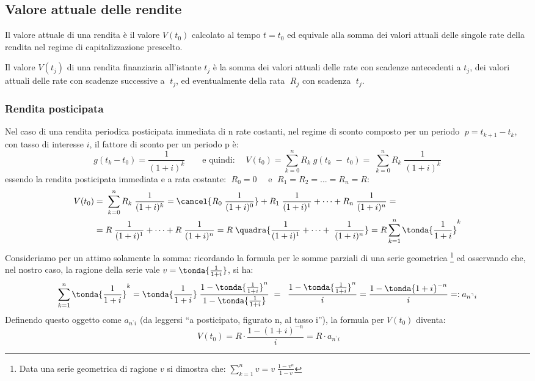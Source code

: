\subsection{Valore attuale delle rendite}
Il valore attuale di una rendita è il valore $V(t_0)$  calcolato al tempo $t = 
t_0$  ed equivale alla somma dei valori attuali delle singole rate della 
rendita nel regime di capitalizzazione prescelto.

Il valore $V(t_j)$ di una rendita finanziaria all'istante $t_j$ è la somma dei valori
attuali delle rate con scadenze antecedenti a $t_j$, dei valori attuali delle rate con 
scadenze successive a $\;t_j$, ed eventualmente della rata $\;R_j$ con scadenza 
$\;t_j$.

\subsubsection{Rendita posticipata}

Nel caso di una rendita periodica posticipata immediata di n rate costanti, nel 
regime di sconto composto per un periodo \(\; p= 
t_{k+1}-t_k\), con tasso di interesse $i$, il fattore di sconto per un periodo p è:
\[g(t_k-t_0)=\frac{1}{(1+i)^k} \qquad \text{e quindi:} \quad \; V(t_0)=\sum^{n}_{k=0}R_k \; g(t_k\;-\;t_0)= \; \sum^{n}_{k=0}R_k \; 
\frac{1}{(1+i)^k}\]
essendo la rendita posticipata immediata e a rata costante: $\;R_{0}=0 \quad$ e 
$\;R_{1}=R_{2}=...=R_{n}=R$:
\[\begin{aligned}
   V(t_0)&=\; \sum^{n}_{k=0}R_k \; \frac{1}{(1+i)^k} =\cancel{R_0 \; 
\frac{1}{(1+i)^0}}+R_1 \; 
\frac{1}{(1+i)^1}+\dots+R_n \; 
\frac{1}{(1+i)^n} =\\
&= R\; 
\frac{1}{(1+i)^1}+\dots+R \; 
\frac{1}{(1+i)^n} = R\; \quadra{
\frac{1}{(1+i)^1}+\dots+\; 
\frac{1}{(1+i)^n}} = R \sum^{n}_{k=1}\tonda{\frac{1}{1+i}}^k 
  \end{aligned}
\]
Consideriamo per un attimo solamente la somma: ricordando la formula per le somme parziali di una serie geometrica
\footnote{Data una serie geometrica di ragione $v$ si dimostra che: 
\(\displaystyle \sum^{n}_{k=1} v = v\; \frac{1-v^n}{1-v}\)} ed osservando che, nel nostro caso, la ragione
della serie vale $v = \tonda{\frac{1}{1+i}}$, si ha:
$$\sum^{n}_{k=1}\tonda{\frac{1}{1+i}}^k = \tonda{\frac{1}{1+i}} 
\;\frac{1-\tonda{\frac{1}{1+i}} ^n}{1-\tonda{\frac{1}{1+i}} }\; = \;\; 
\frac{1-\tonda{\frac{1}{1+i}} ^n}{i} = \frac{1-\tonda{1+i} ^{-n}}{i} =: a_{n^\urcorner i}$$
Definendo questo oggetto come $a_{n^\urcorner i}$ (da 
leggersi ``a posticipato, figurato n, al tasso i''), la formula per $V(t_0)$ diventa:
$$\; V(t_0)= R\cdot\frac{1-(1+i)^{-n}}{i}= R\cdot a_{n^\urcorner i}$$

